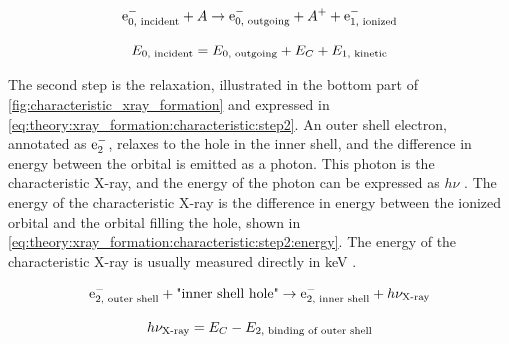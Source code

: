 \begin{equation}
    \label{eq:theory:xray_formation:characteristic:step1}
    \textnormal{e}^-_{0 \textnormal{, incident}} + A \rightarrow \textnormal{e}^-_{0 \textnormal{, outgoing}} + A^+ + \textnormal{e}^-_{1 \textnormal{, ionized}}
\end{equation}

\begin{equation}
    \label{eq:theory:xray_formation:characteristic:step1:energy_balance}
    E_{0 {\textnormal{, incident}}} = E_{0 {\textnormal{, outgoing}}} + E_{C} + E_{1 {\textnormal{, kinetic}}}
\end{equation}




The second step is the relaxation, illustrated in the bottom part of \cref{fig:characteristic_xray_formation} and expressed in \cref{eq:theory:xray_formation:characteristic:step2}.
An outer shell electron, annotated as $\textnormal{e}^-_{2}$, relaxes to the hole in the inner shell, and the difference in energy between the orbital is emitted as a photon.
This photon is the characteristic X-ray, and the energy of the photon can be expressed as $h\nu$ \cite[Eq. (8.12)]{hollas_modern_2004}.
The energy of the characteristic X-ray is the difference in energy between the ionized orbital and the orbital filling the hole, shown in \cref{eq:theory:xray_formation:characteristic:step2:energy}.
The energy of the characteristic X-ray is usually measured directly in keV \cite[Eq. (4.2b)]{goldstein_scanning_2018}.


\begin{equation}
    \label{eq:theory:xray_formation:characteristic:step2}
    \textnormal{e}^-_{2 {\textnormal{, outer shell}}} + \textnormal{"inner shell hole"} \rightarrow \textnormal{e}^-_{2 {\textnormal{, inner shell}}} + h\nu_{\textnormal{X-ray}}
\end{equation}


\begin{equation}
    \label{eq:theory:xray_formation:characteristic:step2:energy}
    h\nu_{\textnormal{X-ray}} = E_C - E_{2 {\textnormal{, binding of outer shell}}}
\end{equation}


